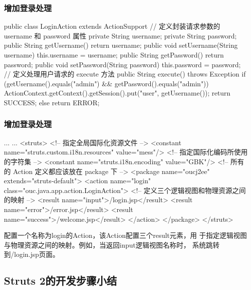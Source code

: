 \begin{frame}[fragile] %
\frametitle{增加登录处理}


\begin{javaCode}
  public class LoginAction extends ActionSupport {
    // 定义封装请求参数的 username 和 password 属性
    private String username;
    private String password;
    public String getUsername() {
      return username;
    }
    public void setUsername(String username) {
      this.username = username;
    }
    public String getPassword() {
      return password;
    }
    public void setPassword(String password) {
      this.password = password;
    }
    // 定义处理用户请求的 execute 方法
    public String execute() throws Exception {
      if (getUsername().equals("admin") && getPassword().equals("admin")) {
        ActionContext.getContext().getSession().put("user", getUsername());
        return SUCCESS;
      } else {
        return ERROR;
      }
    }
  }
\end{javaCode}
\end{frame}

\begin{frame}[fragile] %
\frametitle{增加登录处理}


\begin{xmlCode}
... ...
<struts>
  <!-- 指定全局国际化资源文件 -->
  <constant name="struts.custom.i18n.resources" value="mess"/>
  <!-- 指定国际化编码所使用的字符集 -->	
  <constant name="struts.i18n.encoding" value="GBK"/>
  <!-- 所有的 Action 定义都应该放在 package 下 -->
  <package name="oucj2ee" extends="struts-default">
    <action name="login" class="ouc.java.app.action.LoginAction">
    <!-- 定义三个逻辑视图和物理资源之间的映射 -->		
      <result name="input">/login.jsp</result>
      <result name="error">/error.jsp</result>
      <result name="success">/welcome.jsp</result>
    </action>
  </package>
</struts>
\end{xmlCode}

{\Blue\kai 配置一个名称为login的Action，该Action配置三个result元素，用
  于指定逻辑视图与物理资源之间的映射。例如，当返回input逻辑视图名称时，
  系统跳转到/login.jsp页面。}
\end{frame}

\subsection{Struts 2的开发步骤小结}

